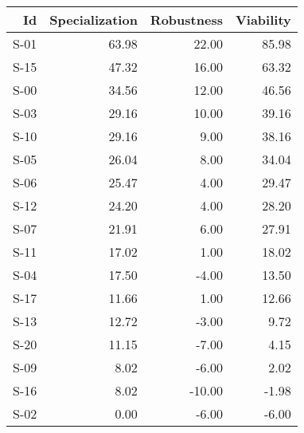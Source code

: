 

\begin{tabular}{ | r | r | r | r | }
    \hline
                    Id  &  Specialization  &      Robustness  &       Viability  \\
    \hline
    \hline
                  S-01  &           63.98  &           22.00  &           85.98  \\
    \hline
                  S-15  &           47.32  &           16.00  &           63.32  \\
    \hline
                  S-00  &           34.56  &           12.00  &           46.56  \\
    \hline
                  S-03  &           29.16  &           10.00  &           39.16  \\
    \hline
                  S-10  &           29.16  &            9.00  &           38.16  \\
    \hline
                  S-05  &           26.04  &            8.00  &           34.04  \\
    \hline
                  S-06  &           25.47  &            4.00  &           29.47  \\
    \hline
                  S-12  &           24.20  &            4.00  &           28.20  \\
    \hline
                  S-07  &           21.91  &            6.00  &           27.91  \\
    \hline
                  S-11  &           17.02  &            1.00  &           18.02  \\
    \hline
                  S-04  &           17.50  &           -4.00  &           13.50  \\
    \hline
                  S-17  &           11.66  &            1.00  &           12.66  \\
    \hline
                  S-13  &           12.72  &           -3.00  &            9.72  \\
    \hline
                  S-20  &           11.15  &           -7.00  &            4.15  \\
    \hline
                  S-09  &            8.02  &           -6.00  &            2.02  \\
    \hline
                  S-16  &            8.02  &          -10.00  &           -1.98  \\
    \hline
                  S-02  &            0.00  &           -6.00  &           -6.00  \\

\end{tabular}
